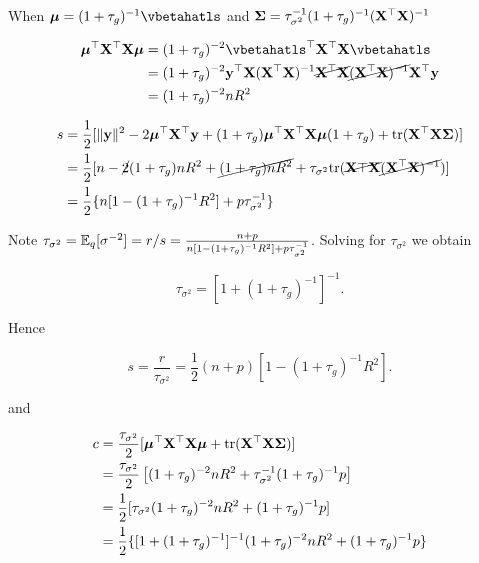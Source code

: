 \documentclass{amsart}[12pt]
\begin{document}
When $\vmu = (1 + \tau_g)^{-1} \vbetahatls$ and ${\boldsymbol \Sigma} = \tau_{\sigma^2}^{-1} (1 + \tau_g)^{-1} ({\bf X}^\top {\bf X})^{-1}$

\begin{align*}
	\vmu^\top \mX^\top \mX \vmu & = (1 + \tau_g)^{-2} \vbetahatls^\top \mX^\top \mX \vbetahatls                                                        \\
	                            & = (1 + \tau_g)^{-2} \vy^\top \mX (\mX^\top \mX)^{-1} \cancel{\mX^\top \mX} \cancel{(\mX^\top \mX)^{-1}} \mX^\top \vy \\
	                            & = (1 + \tau_g)^{-2} n R^2                                                                                            
\end{align*}

\begin{align*}
	s & = \frac{1}{2} [\|{\bf y}\|^2 - 2 {\boldsymbol \mu}^\top {\bf X}^\top {\bf y} + (1 + \tau_g) {\boldsymbol \mu}^\top {\bf X}^\top {\bf X} {\boldsymbol\mu} (1 + \tau_g) +  \text{tr} ({\bf X}^\top {\bf X} {\boldsymbol\Sigma})]                 \\
	  & = \frac{1}{2} [n - \cancel{2} (1 + \tau_g) n R ^2 + \cancel{(1 + \tau_g) n R^2} + \tau_{\sigma^2} \text{tr} (\cancel{{\bf X}\top {\bf X}} \cancel{({\bf X}^\top {\bf X})^{-1}})] \\
	  & = \frac{1}{2} \{ n[1 - (1 + \tau_g)^{-1} R^2] + p \tau_{\sigma^2}^{-1} \}                                                                                  
\end{align*}

Note $\tau_{\sigma^2} = \mathbb{E}_q [\sigma^{-2}] = r/s = \frac{n+p}{n[1 - (1 + \tau_g)^{-1} R^2] + p \tau_{\sigma^2}^{-1}}$. Solving for $\tau_{\sigma^2}$ we obtain

\[
	\tau_{\sigma^2} = [1 + (1 + \tau_g)^{-1}]^{-1}.
\]

Hence

\[
	s = \frac{r}{\tau_{\sigma^2}} = \frac{1}{2} (n + p) [1 - (1 + \tau_g)^{-1} R^2].
\]

and

\begin{align*}
	c & = \frac{\tau_{\sigma^2}}{2}[{\boldsymbol \mu}^\top {\bf X}^\top {\bf X} {\boldsymbol\mu} + \text{tr} ({\bf X}^\top {\bf X} {\boldsymbol\Sigma})]                      \\
	  & = \frac{\tau_{\sigma^2}}{2}\left[(1 + \tau_g)^{-2} n R^2 + \tau_{\sigma^2}^{-1} (1 + \tau_g)^{-1} p\right] \\
	  & = \frac{1}{2} [ \tau_{\sigma^2} (1 + \tau_g)^{-2} n R^2 + (1 + \tau_g)^{-1} p]                             \\
	  & = \frac{1}{2} \{ [1 + (1 + \tau_g)^{-1}]^{-1} (1 + \tau_g)^{-2} n R^2 + (1 + \tau_g)^{-1} p\}              
\end{align*}
\end{document}
